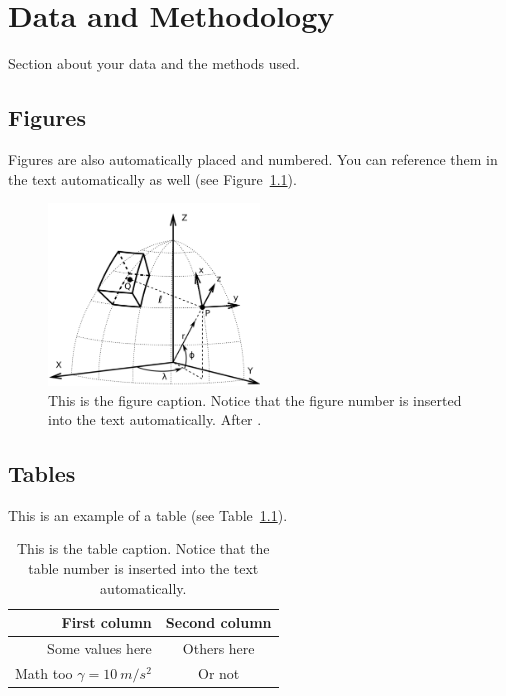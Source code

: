 \chapter{Data and Methodology}

Section about your data and the methods used.


\section{Figures}

Figures are also automatically placed and numbered. You can reference them in
the text automatically as well (see Figure~\ref{fig:example}).

\begin{figure}[h]
  \begin{center}
    \includegraphics[width=0.5\textwidth]{figures/tesseroid-coord-sys.png}
  \end{center}
  \caption{
    This is the figure caption. Notice that the figure number is inserted into
    the text automatically. After \citet{uieda2015}.
  }
  \label{fig:example}
\end{figure}


\section{Tables}

This is an example of a table (see Table~\ref{tab:example}).

\begin{table}[h]
  \begin{center}
    \begin{tabular}{rc}
      \textbf{First column}    &     \textbf{Second column}
      \\
      \hline
      Some values here  &  Others here
      \\
      Math too $\gamma = 10\ m/s^2$  &  Or not
    \end{tabular}
  \end{center}
  \caption{
    This is the table caption. Notice that the table number is inserted into
    the text automatically.
  }
  \label{tab:example}
\end{table}


